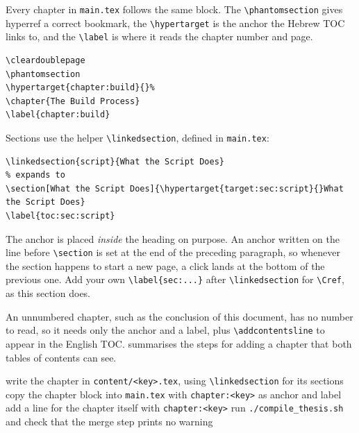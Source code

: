 \label{sec:sections}

Every chapter in \texttt{main.tex} follows the same block.
The \verb|\phantomsection| gives hyperref a correct bookmark, the \verb|\hypertarget| is the anchor the Hebrew TOC links to, and the \verb|\label| is where it reads the chapter number and page.

\begin{lstlisting}
\cleardoublepage
\phantomsection
\hypertarget{chapter:build}{}%
\chapter{The Build Process}
\label{chapter:build}

\end{lstlisting}

Sections use the helper \verb|\linkedsection|, defined in \texttt{main.tex}:

\begin{lstlisting}
\linkedsection{script}{What the Script Does}
% expands to
\section[What the Script Does]{\hypertarget{target:sec:script}{}What the Script Does}
\label{toc:sec:script}
\end{lstlisting}

The anchor is placed \emph{inside} the heading on purpose. An anchor written on the line before \verb|\section| is set at the end of the preceding paragraph, so whenever the section happens to start a new page, a click lands at the bottom of the previous one.
Add your own \verb|\label{sec:...}| after \verb|\linkedsection| for \verb|\Cref|, as this section does.

An unnumbered chapter, such as the conclusion of this document, has no number to read, so it needs only the anchor and a label, plus \verb|\addcontentsline| to appear in the English TOC.
 summarises the steps for adding a chapter that both tables of contents can see.

\begin{algorithm}[htb]
\caption{Adding a chapter}
\label{alg:chapter}
write the chapter in \texttt{content/<key>.tex}, using \texttt{\textbackslash linkedsection} for its sections\;
copy the chapter block into \texttt{main.tex} with \texttt{chapter:<key>} as anchor and label\;
add a line for the chapter itself with \texttt{chapter:<key>}\;
run \texttt{./compile\_thesis.sh} and check that the merge step prints no warning\;
\end{algorithm}

